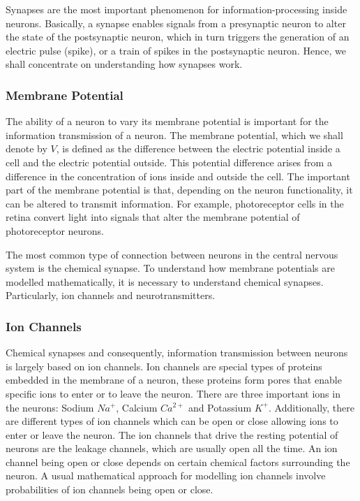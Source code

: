 \documentclass{uonmathreport}
\begin{document}
Synapses are the most important phenomenon for information-processing inside neurons. Basically, a synapse enables signals from a presynaptic neuron to alter the state of the postsynaptic neuron, which in turn triggers the generation of an electric pulse (spike), or a train of spikes in the postsynaptic neuron. Hence, we shall concentrate on understanding how synapses work.

\subsubsection{Membrane Potential}\label{subsubsec:membrane_pot}

The ability of a neuron to vary its membrane potential is important for the information transmission of a neuron. The membrane potential, which we shall denote by $V$, is defined as the difference between the electric potential inside a cell and the electric potential outside. This potential difference arises from a difference in the concentration of ions inside and outside the cell. The important part of the membrane potential is that, depending on the neuron functionality, it can be altered to transmit information. For example, photoreceptor cells in the retina convert light into signals that alter the membrane potential of photoreceptor neurons.

The most common type of connection between neurons in the central nervous system is the chemical synapse. To understand how membrane potentials are modelled mathematically, it is necessary to understand chemical synapses. Particularly, ion channels and neurotransmitters. 

\subsubsection{Ion Channels}\label{subsubsec:ion_chan}
Chemical synapses and consequently, information transmission between neurons is largely based on ion channels. 
Ion channels are special types of proteins embedded in the membrane of a neuron, these proteins form pores that enable specific ions to enter or to leave the neuron. There are three important ions in the neurons: Sodium $Na^+$, Calcium $Ca^{2+}$ and Potassium $K^+$. Additionally, there are different types of ion channels which can be open or close allowing ions to enter or leave the neuron. The ion channels that drive the resting potential of neurons are the leakage channels, which are usually open all the time. An ion channel being open or close depends on certain chemical factors surrounding the neuron. A usual mathematical approach for modelling ion channels involve probabilities of ion channels being open or close. 
\end{document}
